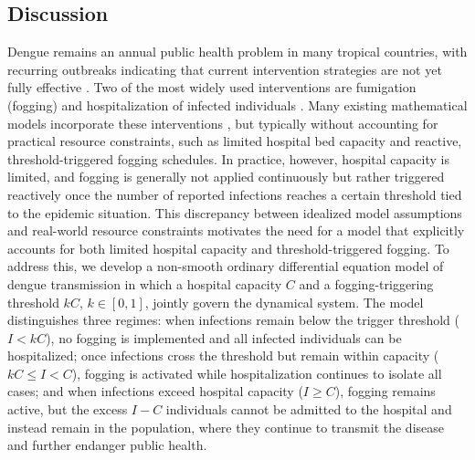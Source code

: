 \documentclass[preprint]{elsarticle}
\begin{document}
\subsection{Discussion}
Dengue remains an annual public health problem in many tropical countries, with recurring outbreaks indicating that current intervention strategies are not yet fully effective \cite{guzman2010dengue}. Two of the most widely used interventions are fumigation (fogging) and hospitalization of infected individuals \cite{oki2011optimal}. Many existing mathematical models incorporate these interventions \cite{aldila2023impact,rodrigues2010insecticide,rodrigues2013bioeconomic}, but typically without accounting for practical resource constraints, such as limited hospital bed capacity and reactive, threshold-triggered fogging schedules. In practice, however, hospital capacity is limited, and fogging is generally not applied continuously but rather triggered reactively once the number of reported infections reaches a certain threshold tied to the epidemic situation. This discrepancy between idealized model assumptions and real-world resource constraints motivates the need for a model that explicitly accounts for both limited hospital capacity and threshold-triggered fogging. To address this, we develop a non-smooth ordinary differential equation model of dengue transmission in which a hospital capacity $C$ and a fogging-triggering threshold $kC$, $k \in [0,1]$, jointly govern the dynamical system. The model distinguishes three regimes: when infections remain below the trigger threshold ($I < kC$), no fogging is implemented and all infected individuals can be hospitalized; once infections cross the threshold but remain within capacity ($kC \leq  I < C$), fogging is activated while hospitalization continues to isolate all cases; and when infections exceed hospital capacity ($I \geq  C$), fogging remains active, but the excess $I - C$ individuals cannot be admitted to the hospital and instead remain in the population, where they continue to transmit the disease and further endanger public health.
\end{document}
